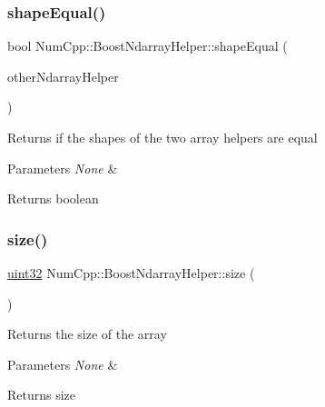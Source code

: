 \subsubsection{\texorpdfstring{shape\+Equal()}{shapeEqual()}}
{\footnotesize\ttfamily bool Num\+Cpp\+::\+Boost\+Ndarray\+Helper\+::shape\+Equal (\begin{DoxyParamCaption}\item[{\mbox{\hyperlink{class_num_cpp_1_1_boost_ndarray_helper}{Boost\+Ndarray\+Helper}} \&}]{other\+Ndarray\+Helper }\end{DoxyParamCaption})\hspace{0.3cm}{\ttfamily [inline]}}

Returns if the shapes of the two array helpers are equal


\begin{DoxyParams}{Parameters}
{\em None} & \\
\hline
\end{DoxyParams}
\begin{DoxyReturn}{Returns}
boolean 
\end{DoxyReturn}
\mbox{\label{class_num_cpp_1_1_boost_ndarray_helper_ac61d43462f27d53f0265e16894e2c9b9}} 
\subsubsection{\texorpdfstring{size()}{size()}}
{\footnotesize\ttfamily \mbox{\hyperlink{namespace_num_cpp_a36f388e948380413c63011cab9b7fbd5}{uint32}} Num\+Cpp\+::\+Boost\+Ndarray\+Helper\+::size (\begin{DoxyParamCaption}{ }\end{DoxyParamCaption})\hspace{0.3cm}{\ttfamily [inline]}}

Returns the size of the array


\begin{DoxyParams}{Parameters}
{\em None} & \\
\hline
\end{DoxyParams}
\begin{DoxyReturn}{Returns}
size 
\end{DoxyReturn}
\mbox{\label{class_num_cpp_1_1_boost_ndarray_helper_a2ba8bec864ae6ee599a553a00352ba5c}} 
